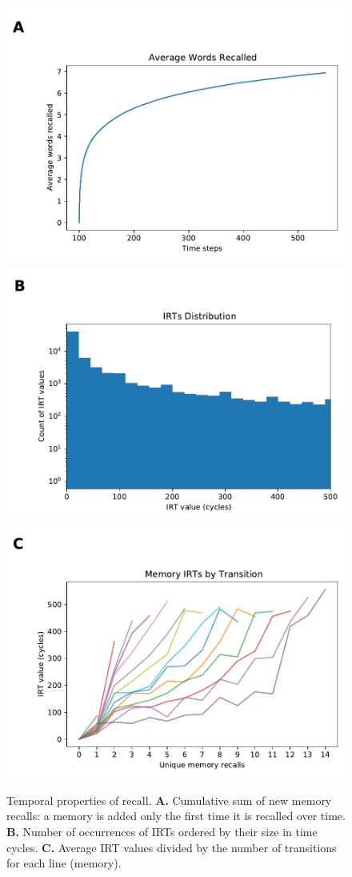     \begin{figure}
        \centering
        \includegraphics[width=.69\textwidth]{graphics/time_words_recalled.pdf}
        \includegraphics[width=.69\textwidth]{graphics/time_distribution_irt.pdf}
        \includegraphics[width=.69\textwidth]{graphics/time_average_irt.pdf}
        \caption{
        Temporal properties of recall.
        \textbf{A.} Cumulative sum of new memory recalls: a memory is added only the first time it is recalled over time.
        \textbf{B.} Number of occurrences of IRTs ordered by their size in time cycles.
        \textbf{C.} Average IRT values divided by the number of transitions for each line (memory).
        }
        \label{fig:temporal_properties_recall}
    \end{figure}
    \clearpage
    
